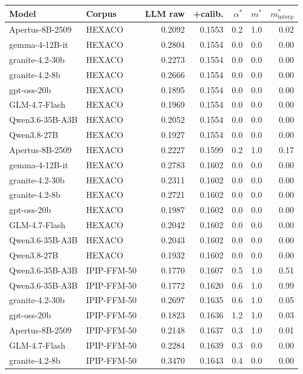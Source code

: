 \begin{tabular}{llrrrrr}
\toprule
Model & Corpus & LLM raw & +calib. & $\alpha^{*}$ & $m^{*}$ & $m^{*}_{\mathrm{interp}}$\\
\midrule
Apertus-8B-2509 & HEXACO & 0.2092 & 0.1553 & 0.2 & 1.0 & 0.02\\
gemma-4-12B-it & HEXACO & 0.2804 & 0.1554 & 0.0 & 0.0 & 0.00\\
granite-4.2-30b & HEXACO & 0.2273 & 0.1554 & 0.0 & 0.0 & 0.00\\
granite-4.2-8b & HEXACO & 0.2666 & 0.1554 & 0.0 & 0.0 & 0.00\\
gpt-oss-20b & HEXACO & 0.1895 & 0.1554 & 0.0 & 0.0 & 0.00\\
GLM-4.7-Flash & HEXACO & 0.1969 & 0.1554 & 0.0 & 0.0 & 0.00\\
Qwen3.6-35B-A3B & HEXACO & 0.2052 & 0.1554 & 0.0 & 0.0 & 0.00\\
Qwen3.8-27B & HEXACO & 0.1927 & 0.1554 & 0.0 & 0.0 & 0.00\\
Apertus-8B-2509 & HEXACO & 0.2227 & 0.1599 & 0.2 & 1.0 & 0.17\\
gemma-4-12B-it & HEXACO & 0.2783 & 0.1602 & 0.0 & 0.0 & 0.00\\
granite-4.2-30b & HEXACO & 0.2311 & 0.1602 & 0.0 & 0.0 & 0.00\\
granite-4.2-8b & HEXACO & 0.2721 & 0.1602 & 0.0 & 0.0 & 0.00\\
gpt-oss-20b & HEXACO & 0.1987 & 0.1602 & 0.0 & 0.0 & 0.00\\
GLM-4.7-Flash & HEXACO & 0.2042 & 0.1602 & 0.0 & 0.0 & 0.00\\
Qwen3.6-35B-A3B & HEXACO & 0.2043 & 0.1602 & 0.0 & 0.0 & 0.00\\
Qwen3.8-27B & HEXACO & 0.1932 & 0.1602 & 0.0 & 0.0 & 0.00\\
Qwen3.6-35B-A3B & IPIP-FFM-50 & 0.1770 & 0.1607 & 0.5 & 1.0 & 0.51\\
Qwen3.6-35B-A3B & IPIP-FFM-50 & 0.1772 & 0.1620 & 0.6 & 1.0 & 0.99\\
granite-4.2-30b & IPIP-FFM-50 & 0.2697 & 0.1635 & 0.6 & 1.0 & 0.05\\
gpt-oss-20b & IPIP-FFM-50 & 0.1823 & 0.1636 & 1.2 & 1.0 & 0.03\\
Apertus-8B-2509 & IPIP-FFM-50 & 0.2148 & 0.1637 & 0.3 & 1.0 & 0.01\\
GLM-4.7-Flash & IPIP-FFM-50 & 0.2284 & 0.1639 & 0.3 & 0.0 & 0.00\\
granite-4.2-8b & IPIP-FFM-50 & 0.3470 & 0.1643 & 0.4 & 0.0 & 0.00\\

\end{tabular}
